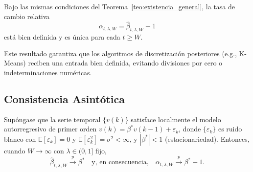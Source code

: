\begin{corollary}
\label{cor:etcrocm_alpha}
Bajo las mismas condiciones del Teorema~\ref{teo:existencia_general},
la tasa de cambio relativa
\begin{equation}
\alpha_{t,\lambda,W} = \hat{\beta}_{t,\lambda,W} - 1
\label{eq:alpha_general}
\end{equation}
está bien definida y es única para cada $t \geq W$.
\end{corollary}

Este resultado garantiza que los algoritmos de discretización
posteriores (e.g., K-Means) reciben una entrada bien definida,
evitando divisiones por cero o indeterminaciones numéricas.

\subsection{Consistencia Asintótica}
\label{subsec:teorema_consistencia}

\begin{theorem}
\label{teo:consistencia_general}
Supóngase que la serie temporal $\{v(k)\}$ satisface localmente
el modelo autorregresivo de primer orden
$v(k) = \beta^* v(k-1) + \varepsilon_k$,
donde $\{\varepsilon_k\}$ es ruido blanco con
$\mathbb{E}[\varepsilon_k] = 0$ y
$\mathbb{E}[\varepsilon_k^2] = \sigma^2 < \infty$,
y $|\beta^*| < 1$ (estacionariedad).  Entonces, cuando
$W \to \infty$ con $\lambda \in (0,1]$ fijo,
\[
\hat{\beta}_{t,\lambda,W} \xrightarrow{p} \beta^*
\quad \text{y, en consecuencia,} \quad
\alpha_{t,\lambda,W} \xrightarrow{p} \beta^* - 1.
\]
\end{theorem}

